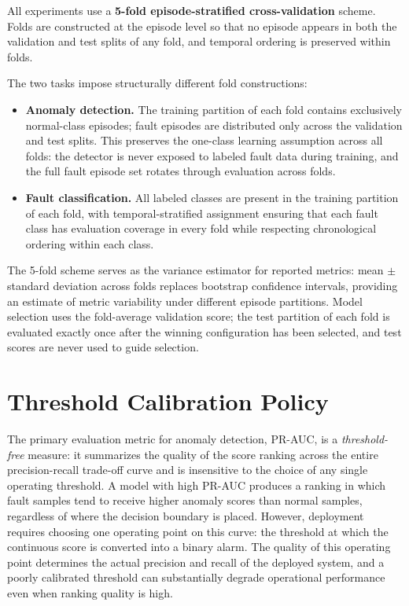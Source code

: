 All experiments use a \textbf{5-fold episode-stratified cross-validation} scheme. Folds are constructed at the episode level so that no episode appears in both the validation and test splits of any fold, and temporal ordering is preserved within folds.

The two tasks impose structurally different fold constructions:

\begin{itemize}
    \item \textbf{Anomaly detection.} The training partition of each fold contains exclusively normal-class episodes; fault episodes are distributed only across the validation and test splits. This preserves the one-class learning assumption across all folds: the detector is never exposed to labeled fault data during training, and the full fault episode set rotates through evaluation across folds.
    \item \textbf{Fault classification.} All labeled classes are present in the training partition of each fold, with temporal-stratified assignment ensuring that each fault class has evaluation coverage in every fold while respecting chronological ordering within each class.
\end{itemize}

The 5-fold scheme serves as the variance estimator for reported metrics: mean $\pm$ standard deviation across folds replaces bootstrap confidence intervals, providing an estimate of metric variability under different episode partitions. Model selection uses the fold-average validation score; the test partition of each fold is evaluated exactly once after the winning configuration has been selected, and test scores are never used to guide selection.

\section{Threshold Calibration Policy}
\label{sec:threshold-calibration}

The primary evaluation metric for anomaly detection, PR-AUC, is a \emph{threshold-free} measure: it summarizes the quality of the score ranking across the entire precision-recall trade-off curve and is insensitive to the choice of any single operating threshold. A model with high PR-AUC produces a ranking in which fault samples tend to receive higher anomaly scores than normal samples, regardless of where the decision boundary is placed. However, deployment requires choosing one operating point on this curve: the threshold at which the continuous score is converted into a binary alarm. The quality of this operating point determines the actual precision and recall of the deployed system, and a poorly calibrated threshold can substantially degrade operational performance even when ranking quality is high.

